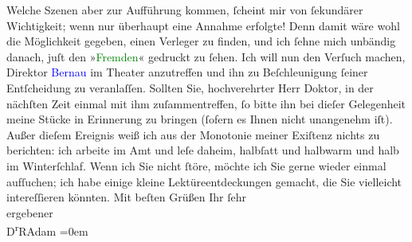            \pstart
           Welche Szenen aber zur Aufführung kommen, ſcheint mir von ſekundärer Wichtigkeit;
                    wenn nur überhaupt eine Annahme erfolgte! Denn damit wäre wohl die Möglichkeit
                    gegeben, einen Verleger zu finden, und ich ſehne mich unbändig danach, juſt den
                        »\textcolor{green}{Fremden}{}\ledrightnote{\textcolor{green}{Yppl. Idylle in fünf Akten}}« gedruckt zu ſehen.\pend
           \pstart
           Ich will nun den Verſuch machen, Direktor \textcolor{blue}{Bernau}{}\ledrightnote{\textcolor{blue}{Alfred Bernau}} im Theater anzu{\pb}treffen und ihn zu Beſchleunigung ſeiner Entſcheidung zu veranlaſſen. Sollten
                    Sie, hochverehrter Herr Doktor, in der nächſten Zeit einmal mit ihm
                    zuſammentreffen, ſo bitte ihn bei dieſer Gelegenheit meine Stücke in Erinnerung
                    zu bringen (ſofern es Ihnen nicht unangenehm iſt).\pend
           \pstart
           Außer dieſem Ereignis weiß ich aus der Monotonie meiner Exiſtenz nichts zu
                    berichten: ich arbeite im Amt und leſe daheim, halbſatt und halbwarm und halb im
                    Winterſchlaf.\pend
           \pstart
           Wenn ich Sie nicht ſtöre, möchte ich Sie gerne wieder einmal aufſuchen; ich habe
                    einige kleine Lektüreentdeckungen gemacht, die Sie vielleicht intereſſieren
                    könnten.\pend
           \pstart
           Mit beſten Grüßen Ihr ſehr{\\[\baselineskip]}ergebener{\\[\baselineskip]}\spacefill\mbox{D\textsuperscript{r}RAdam}\pend
           \leftskip=0em{}\endnumbering{}  
      